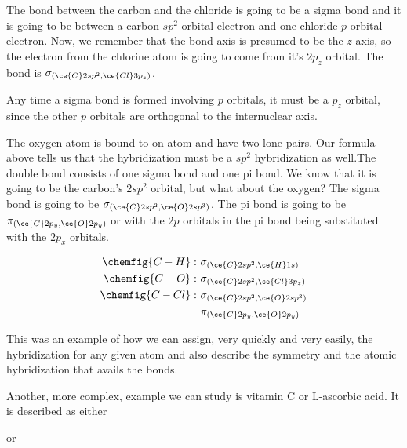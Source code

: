 \documentclass[../mit-general-chemistry.tex]{subfiles}
\begin{document}
The bond between the carbon and the chloride is going to be a sigma
bond and it is going to be between a carbon $sp^2$ orbital electron
and one chloride $p$ orbital electron. Now, we remember that the bond
axis is presumed to be the $z$ axis, so the electron from the chlorine
atom is going to come from it's $2p_z$ orbital. The bond is
$\sigma_{(\ce{C}2sp^2, \ce{Cl}3p_z)}$.

Any time a sigma bond is formed involving $p$ orbitals, it must be a
$p_z$ orbital, since the other $p$ orbitals are orthogonal to the
internuclear axis.

The oxygen atom is bound to on atom and have two lone pairs. Our
formula above tells us that the hybridization must be a $sp^2$
hybridization as well.The double bond consists of one sigma bond and
one pi bond. We know that it is going to be the carbon's $2sp^2$
orbital, but what about the oxygen? The sigma bond is going to be
$\sigma_{(\ce{C}2sp^2, \ce{O}2sp^3)}$. The pi bond is going to be
$\pi_{(\ce{C}2p_y, \ce{O}2p_y)}$ or with the $2p$ orbitals in the pi
bond being substituted with the $2p_x$ orbitals.


\begin{align*}
  \chemfig{C-H}:~&\sigma_{(\ce{C}2sp^2, \ce{H}1s)} \\ 
  \chemfig{C-O}:~&\sigma_{(\ce{C}2sp^2, \ce{Cl}3p_z)} \\ 
  \chemfig{C-Cl}:~&\sigma_{(\ce{C}2sp^2, \ce{O}2sp^3)} \\
  &\pi_{(\ce{C}2p_y, \ce{O}2p_y)} \\
\end{align*}


This was an example of how we can assign, very quickly and very
easily, the hybridization for any given atom and also describe the
symmetry and the atomic hybridization that avails the bonds.



Another, more complex, example we can study is vitamin C or L-ascorbic
acid. It is described as either

\begin{center}
  \hspace*{\fill}
  \hfill%
  or
  \hfill%
  \hspace*{\fill}
\end{center}
\end{document}
